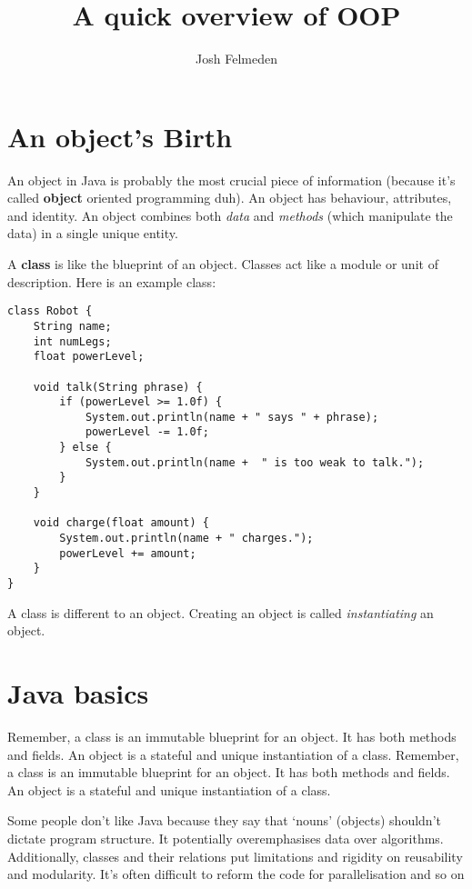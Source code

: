 \documentclass[11pt,a4paper,titlepage,dvipsnames,cmyk]{scrartcl}
\title{A quick overview of OOP}
\author{Josh Felmeden}
\begin{document}
\maketitle
\tableofcontents

\newpage
{}

\section{An object's Birth}%
\label{sec:An object's Birth}

An object in Java is probably the most crucial piece of information
(because it's called \textbf{object} oriented programming duh). An object
has behaviour, attributes, and identity. An object combines both
\textit{data} and \textit{methods} (which manipulate the data) in a single
unique entity.

A \textbf{class} is like the blueprint of an object. Classes act like a
module or unit of description. Here is an example class:

\begin{lstlisting}
class Robot {
    String name;
    int numLegs;
    float powerLevel;

    void talk(String phrase) {
        if (powerLevel >= 1.0f) {
            System.out.println(name + " says " + phrase);
            powerLevel -= 1.0f;
        } else {
            System.out.println(name +  " is too weak to talk.");
        }
    }

    void charge(float amount) {
        System.out.println(name + " charges.");
        powerLevel += amount;
    }
}

\end{lstlisting}

A class is different to an object. Creating an object is called
\textit{instantiating} an object.

\section{Java basics}%
\label{sec:basics}
Remember, a class is an immutable blueprint for an object. It has both
methods and fields. An object is a stateful and unique instantiation of a
class. Remember, a class is an immutable blueprint for an object. It has both
methods and fields. An object is a stateful and unique instantiation of a
class.

Some people don't like Java because they say that `nouns' (objects)
shouldn't dictate program structure. It potentially overemphasises data
over algorithms. Additionally, classes and their relations put limitations
and rigidity on reusability and modularity. It's often difficult to reform
the code for parallelisation and so on
\end{document}
